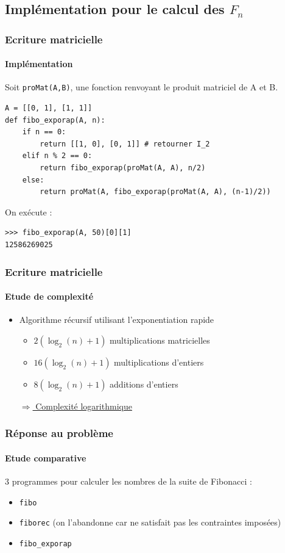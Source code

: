 \documentclass[10pt]{beamer}
\begin{document}
\subsection{Implémentation pour le calcul des $F_n$}
\begin{frame}[fragile]
\frametitle{Ecriture matricielle}
\framesubtitle{Implémentation}
Soit \verb+proMat(A,B)+, une fonction renvoyant le produit matriciel de A et B.
\begin{verbatim}
A = [[0, 1], [1, 1]]
def fibo_exporap(A, n):
    if n == 0:
        return [[1, 0], [0, 1]] # retourner I_2
    elif n % 2 == 0:
        return fibo_exporap(proMat(A, A), n/2)
    else:
        return proMat(A, fibo_exporap(proMat(A, A), (n-1)/2))
\end{verbatim}
\pause
On exécute :
\begin{verbatim}
>>> fibo_exporap(A, 50)[0][1]
12586269025
\end{verbatim}
\end{frame}

\begin{frame}
\frametitle{Ecriture matricielle}
\framesubtitle{Etude de complexité}
\begin{itemize}
\item Algorithme récursif utilisant l'exponentiation rapide
\begin{itemize}
\item $2(\log_2(n) + 1)$ multiplications matricielles
\item $16(\log_2(n) + 1)$ multiplications d'entiers
\item $8(\log_2(n) + 1)$ additions d'entiers
\end{itemize}
\underline{$\Longrightarrow$ Complexité logarithmique}
\end{itemize}
\end{frame}


\begin{frame}[fragile]
\frametitle{Réponse au problème}
\framesubtitle{Etude comparative}
3 programmes pour calculer les nombres de la suite de Fibonacci :
\begin{itemize}
\item \verb+fibo+
\item \verb+fiborec+ (on l'abandonne car ne satisfait pas les contraintes imposées)
\item \verb+fibo_exporap+ 
\end{itemize}
\end{frame}
\end{document}
